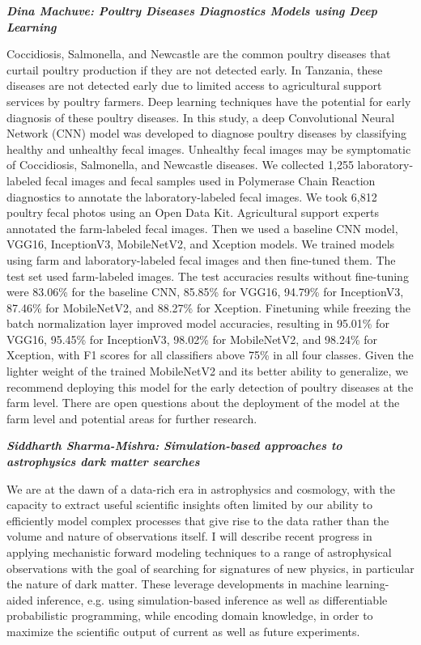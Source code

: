 {\emph{\textbf{Dina Machuve: Poultry Diseases Diagnostics Models using
Deep Learning}}

Coccidiosis, Salmonella, and Newcastle are the common poultry diseases
that curtail poultry production if they are not detected early. In
Tanzania, these diseases are not detected early due to limited access to
agricultural support services by poultry farmers. Deep learning
techniques have the potential for early diagnosis of these poultry
diseases. In this study, a deep Convolutional Neural Network (CNN) model
was developed to diagnose poultry diseases by classifying healthy and
unhealthy fecal images. Unhealthy fecal images may be symptomatic of
Coccidiosis, Salmonella, and Newcastle diseases. We collected 1,255
laboratory-labeled fecal images and fecal samples used in Polymerase
Chain Reaction diagnostics to annotate the laboratory-labeled fecal
images. We took 6,812 poultry fecal photos using an Open Data Kit.
Agricultural support experts annotated the farm-labeled fecal images.
Then we used a baseline CNN model, VGG16, InceptionV3, MobileNetV2, and
Xception models. We trained models using farm and laboratory-labeled
fecal images and then fine-tuned them. The test set used farm-labeled
images. The test accuracies results without fine-tuning were 83.06\% for
the baseline CNN, 85.85\% for VGG16, 94.79\% for InceptionV3, 87.46\%
for MobileNetV2, and 88.27\% for Xception. Finetuning while freezing the
batch normalization layer improved model accuracies, resulting in
95.01\% for VGG16, 95.45\% for InceptionV3, 98.02\% for MobileNetV2, and
98.24\% for Xception, with F1 scores for all classifiers above 75\% in
all four classes. Given the lighter weight of the trained MobileNetV2
and its better ability to generalize, we recommend deploying this model
for the early detection of poultry diseases at the farm level. There are
open questions about the deployment of the model at the farm level and
potential areas for further research.

\emph{\textbf{Siddharth Sharma-Mishra: Simulation-based approaches to
astrophysics dark matter searches}}

We are at the dawn of a data-rich era in astrophysics and cosmology,
with the capacity to extract useful scientific insights often limited by
our ability to efficiently model complex processes that give rise to the
data rather than the volume and nature of observations itself. I will
describe recent progress in applying mechanistic forward modeling
techniques to a range of astrophysical observations with the goal of
searching for signatures of new physics, in particular the nature of
dark matter. These leverage developments in machine learning-aided
inference, e.g. using simulation-based inference as well as
differentiable probabilistic programming, while encoding domain
knowledge, in order to maximize the scientific output of current as well
as future experiments.

}
